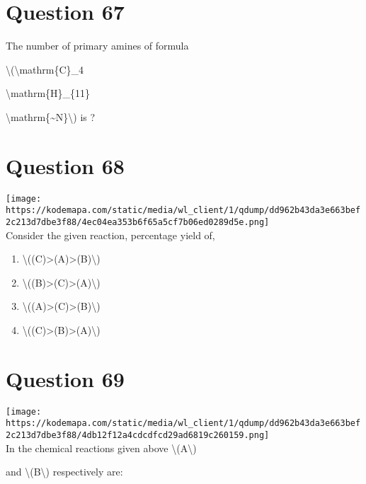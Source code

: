 \documentclass{article}
\begin{document}
\section*{Question 67}
The number of primary amines of formula

\textbackslash(\textbackslash mathrm\{C\}\_4

\textbackslash mathrm\{H\}\_\{11\}

\textbackslash mathrm\{\textasciitilde N\}\textbackslash) is ?


\begin{enumerate}[label=(\alph*)]
\end{enumerate}
\newpage
\section*{Question 68}
\texttt{[image: https://kodemapa.com/static/media/wl\_client/1/qdump/dd962b43da3e663bef2c213d7dbe3f88/4ec04ea353b6f65a5cf7b06ed0289d5e.png]}\\



Consider the given reaction, percentage yield of,~


\begin{enumerate}[label=(\alph*)]
\item \textbackslash((C)\textgreater(A)\textgreater(B)\textbackslash)


\item \textbackslash((B)\textgreater(C)\textgreater(A)\textbackslash)


\item \textbackslash((A)\textgreater(C)\textgreater(B)\textbackslash)


\item \textbackslash((C)\textgreater(B)\textgreater(A)\textbackslash)


\end{enumerate}
\newpage
\section*{Question 69}
\texttt{[image: https://kodemapa.com/static/media/wl\_client/1/qdump/dd962b43da3e663bef2c213d7dbe3f88/4db12f12a4cdcdfcd29ad6819c260159.png]}\\



In the chemical reactions given above \textbackslash(A\textbackslash)

and \textbackslash(B\textbackslash) respectively are:
\end{document}
